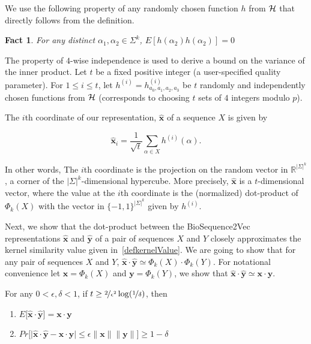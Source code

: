 \documentclass[runningheads]{llncs}
\newtheorem{fact}{Fact}
\newcommand{\vect}[1]{\mathbf{#1}}
\begin{document}
We use the following property of any randomly chosen function $h$ from ${\cal H}$ that directly follows from the definition.

\begin{fact}\label{factIndependence}
For any distinct $\alpha_1, \alpha_2 \in \Sigma^k$, $E[h(\alpha_2) h(\alpha_2)] = 0$
\end{fact}
The property of $4$-wise independence is used to derive a bound on the variance of the inner product.  Let $t$ be a fixed positive integer (a user-specified quality parameter). For $1\leq i \leq t$, let $h^{(i)}
= h^{(i)}_{a_0,a_1,a_2,a_3}$ be $t$ randomly and independently chosen
functions from ${\cal H}$ (corresponds to choosing $t$ sets of $4$
integers modulo $p$).

The $i$th coordinate of our representation, $\vect{\hat{x}}$ of a sequence $X$ is given by 


\begin{equation}\label{sketch}
\vect{\hat{x}}_i  = \dfrac{1}{\sqrt{t}} \sum_{\alpha \in X} h^{(i)}(\alpha) .\end{equation}

In other words, The $i$th coordinate is the projection on the random vector in $\mathbb{R}^{|\Sigma|^k}$, a corner of the $|\Sigma|^k$-dimensional hypercube. More precisely, $\vect{\hat{x}}$ is a $t$-dimensional vector, where the value at the $i$th coordinate is the (normalized) dot-product of $\Phi_k(X)$ with the vector in $\{-1,1\}^{|\Sigma|^k}$ given by $h^{(i)}$. 

Next, we show that the dot-product between the BioSequence2Vec representations $\vect{\hat{x}}$ and $\vect{\hat{y}}$ of a pair of sequences $X$ and $Y$ closely approximates the kernel similarity value given in~\eqref{defkernelValue}. We are going to show that for any pair of sequences $X$ and $Y$,  $\vect{\hat{x}}\cdot \vect{\hat{y}} \simeq \Phi_k (X) \cdot \Phi_k (Y)$. For notational convenience let $\vect{x} = \Phi_k(X)$ and  $\vect{y} = \Phi_k (Y)$, we show that $\vect{\hat{x}}\cdot \vect{\hat{y}} \simeq \vect{x}\cdot \vect{y} $.

\begin{theorem}\label{qualityThm}
For any $0 < \epsilon, \delta < 1$, if  $t\geq \nicefrac{2}{\epsilon^2} \log(\nicefrac{1}{\delta}) $, then 

\begin{enumerate}
\item $E\big[\vect{\hat{x}}\cdot \vect{\hat{y}}\big]  =  \vect{x} \cdot \vect{y}$

\item $Pr\big[ \vert \vect{\hat{x}}\cdot \vect{\hat{y}} - \vect{x} \cdot \vect{y}| \leq \epsilon \|\vect{x}\| \|\vect{y} \| \big] \geq 1-\delta$
\end{enumerate}

\end{theorem}
\end{document}
